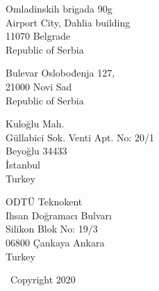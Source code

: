 \documentclass[$if(fontsize)$$fontsize$,$endif$$if(lang)$$babel-lang$,$endif$$if(papersize)$$papersize$paper,$endif$$for(classoption)$$classoption$$sep$,$endfor$]{article}
\begin{document}
Omladinskih brigada 90g\\
Airport City, Dahlia building\\
11070 Belgrade\\
Republic of Serbia

\vskip 0.1in

Bulevar Oslobođenja 127,\\
21000 Novi Sad\\
Republic of Serbia

\vskip 0.1in

Kuloğlu Mah.\\
Güllabici Sok. Venti Apt. No: 20/1\\
Beyoğlu 34433\\
İstanbul\\
Turkey

\vskip 0.1in

ODTÜ Teknokent\\
Ihsan Doğramacı Bulvarı\\
Silikon Blok No: 19/3\\
06800 Çankaya Ankara\\
Turkey

\vskip 0.2in

\textcopyright \ Copyright 2020
\end{document}
